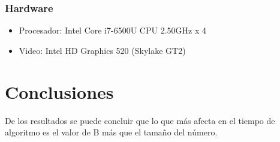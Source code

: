 \documentclass[12pt,letterpaper]{scrartcl}
\begin{document}
\subsubsection{Hardware}
\begin{itemize}
\item Procesador: Intel Core i7-6500U CPU  2.50GHz x 4 
\item Video: Intel HD Graphics 520 (Skylake GT2) 
\end{itemize}

\newpage


\section{Conclusiones}
	
De los resultados se puede concluir que lo que más afecta en el tiempo de algoritmo es el valor de B más que el tamaño del número.
\end{document}
